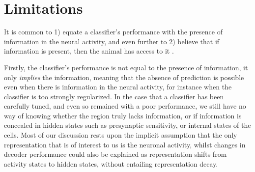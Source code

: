 



\section{Limitations}
    It is common to 1) equate a classifier's performance with the presence of information in the neural activity, and even further to 2) believe that if information is present, then the animal has access to it  \cite{king2014characterizing}. 
    
    Firstly, the classifier's performance is not equal to the presence of information, it only \textit{implies} the information, meaning that the absence of prediction is possible even when there is information in the neural activity, for instance when the classifier is too strongly regularized. In the case that a classifier has been carefully tuned, and even so remained with a poor performance, we still have no way of knowing whether the region truly lacks information, or if information is concealed in hidden states such as presynaptic sensitivity, or internal states of the cells. Most of our discussion rests upon the implicit assumption that the only representation that is of interest to us is the neuronal activity, whilst changes in decoder performance could also be explained as representation shifts from activity states to hidden states, without entailing representation decay. 
    
